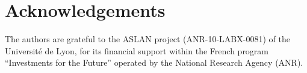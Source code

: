 \documentclass[output=paper]{langscibook}
\begin{document}
\section*{Acknowledgements}
The authors are grateful to the ASLAN project (ANR-10-LABX-0081) of the Université de Lyon, for its financial support within the French program “Investments for the Future” operated by the National Research Agency (ANR).

{\sloppy\printbibliography[heading=subbibliography,notkeyword=this]}
\end{document}
